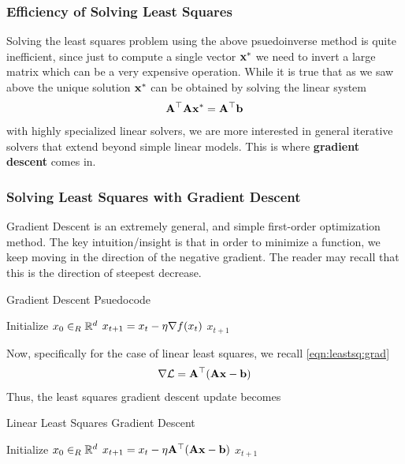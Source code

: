         \subsubsection{Efficiency of Solving Least Squares}
        Solving the least squares problem using the above psuedoinverse method is quite inefficient, since just to compute a single vector $\mathbf{x}^*$ we need to invert a large matrix which can be a very expensive operation. While it is true that as we saw above the unique solution $\mathbf{x}^*$ can be obtained by solving the linear system
        \begin{align*}
            \mathbf{A}^\top \mathbf{A} \mathbf{x}^* = \mathbf{A}^\top {\bf b}
        \end{align*}
        with highly specialized linear solvers, we are more interested in general iterative solvers that extend beyond simple linear models. This is where \textbf{gradient descent} comes in.
        
        \subsubsection{Solving Least Squares with Gradient Descent}
        Gradient Descent is an extremely general, and simple first-order optimization method. The key intuition/insight is that in order to minimize a function, we keep moving in the direction of the negative gradient. The reader may recall that this is the direction of steepest decrease.
        \begin{algorithm}[H]
        \label{algo:gd}
        \caption{Gradient Descent Psuedocode}
        \begin{algorithmic}[1]
        \State Initialize $x_0 \in_R \mathbb{R}^d$
            \State $x_{t+1} = x_t - \eta \nabla f(x_t)$
        \EndWhile
        \Return $x_{t+1}$
        \EndProcedure
        \end{algorithmic}
        \end{algorithm}
        Now, specifically for the case of linear least squares, we recall \autoref{eqn:leastsq:grad}
        \begin{align*}
            \nabla \mathcal{L} = \mathbf{A}^\top (\mathbf{A}\mathbf{x} - {\bf b})
        \end{align*}
        Thus, the least squares gradient descent update becomes
              \begin{algorithm}
        \label{algo:leastsq:gd}
        \caption{Linear Least Squares Gradient Descent}
        \begin{algorithmic}[1]
        \State Initialize $x_0 \in_R \mathbb{R}^d$
            \State $x_{t+1} = x_t - \eta \mathbf{A}^\top (\mathbf{A}\mathbf{x} - {\bf b})$
        \EndWhile
        \Return $x_{t+1}$
        \EndProcedure
        \end{algorithmic}
        \end{algorithm}
        
